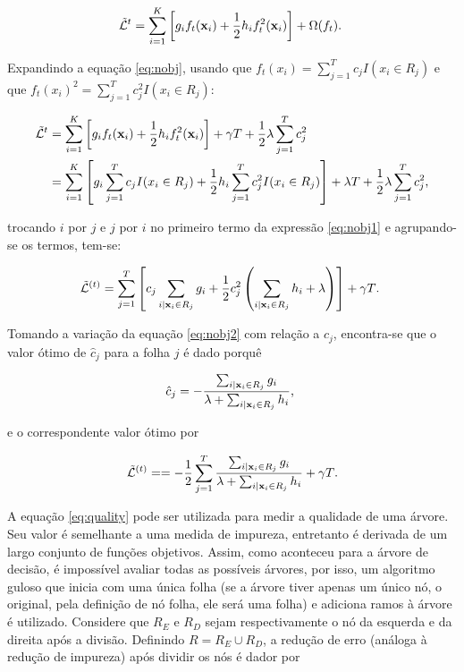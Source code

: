 \begin{equation}\label{eq:nobj}
\mathcal{\tilde{L}}^{t}=\sum_{i=1}^{K}\left[g_if_t({\bf x}_i)+\frac{1}{2}h_if_t^2({\bf x}_i)\right]+\Omega(f_t)\mbox{.}~
\end{equation}

Expandindo a equação \eqref{eq:nobj}, usando que $f_t(x_i)=\sum_{j=1}^{T}c_jI(x_i\in R_j)$ e que $f_t(x_i)^2=\sum_{j=1}^{T}c_j^2I(x_i\in R_j)$:

\begin{align}\label{eq:nobj1}
\mathcal{\tilde{L}}^{t}&=\sum_{i=1}^{K}\left[g_if_t({\bf x}_i)+\frac{1}{2}h_if_t^2({\bf x}_i)\right]+\gamma T + \frac{1}{2}\lambda\sum_{j=1}^Tc_j^2 \\
                       &=\sum_{i=1}^{K}\left[g_i\sum_{j=1}^{T}c_jI(x_i\in R_j)+\frac{1}{2}h_i\sum_{j=1}^{T}c_j^2I(x_i\in R_j)\right]+\lambda{T} + \frac{1}{2}\lambda\sum_{j=1}^Tc_j^2\mbox{,}
\end{align}

trocando $i$ por $j$ e $j$ por $i$ no primeiro termo da expressão \eqref{eq:nobj1} e agrupando-se os termos, tem-se:

\begin{equation}\label{eq:nobj2}
\mathcal{\tilde{L}}^{(t)}=\sum_{j=1}^{T}\left[c_j\sum_{i|{\bf x}_i\in R_j}g_i+\frac{1}{2}c_j^2\left(\sum_{i|{\bf x}_i\in R_j}h_i+\lambda\right)\right]+\gamma{T}\mbox{.}~
\end{equation}

Tomando a variação da equação \eqref{eq:nobj2} com relação a $c_j$, encontra-se que o valor ótimo de  $\hat{c}_j$ para a folha $j$ é dado porquê

\begin{equation}
\hat{c}_j=-\frac{\sum_{i|{\bf x}_i\in R_j}g_i}{\lambda+\sum_{i|{\bf x}_i\in R_j}h_i}\mbox{,}~
\end{equation}

e o correspondente valor ótimo por

\begin{equation}\label{eq:quality}
\mathcal{\tilde{L}}^{(t)}==-\frac{1}{2}\sum_{j=1}^{T}\frac{\sum_{i|{\bf x}_i\in R_j}g_i}{\lambda+\sum_{i|{\bf x}_i\in R_j}h_i}+\gamma T\mbox{.}
\end{equation}

A equação \eqref{eq:quality} pode ser utilizada para medir a qualidade de uma árvore. Seu valor é semelhante a uma medida de impureza, entretanto é derivada de um largo conjunto de funções objetivos. Assim, como aconteceu para a árvore de decisão, é impossível avaliar todas as possíveis árvores, por isso, um algoritmo guloso que inicia com uma única folha (se a árvore tiver apenas um único nó, o original, pela definição de nó folha, ele será uma folha) e adiciona ramos à árvore é utilizado. Considere que $R_E$ e $R_D$ sejam respectivamente o nó da esquerda e da direita após a divisão. Definindo $R=R_E\cup R_D$, a redução de erro (análoga à redução de impureza) após dividir os nós é dador por

